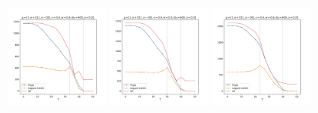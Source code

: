 \documentclass[a4paper]{article}
\begin{document}
\begin{figure}[H]
  \includegraphics[width=0.23\textwidth]{grid-v6-w2_0}
  \includegraphics[width=0.23\textwidth]{grid-v6-w3_0}
  \includegraphics[width=0.23\textwidth]{grid-v6-w4_0}
\end{figure}
\end{document}
